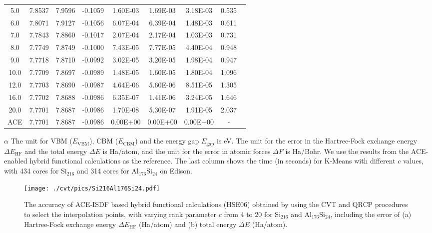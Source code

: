 \begin{table}[htbp]
\begin{threeparttable}
\begin{tabular}{cccccccc}
			 5.0 & 7.8537 & 7.9596 & -0.1059 &  1.60E-03 &  1.69E-03 &  3.18E-03 &  0.535 \ \\
			 6.0 & 7.8071 & 7.9127 & -0.1056 &  6.07E-04 &  6.39E-04 &  1.48E-03 &  0.611 \ \\
			 7.0 & 7.7843 & 7.8860 & -0.1017 &  2.07E-04 &  2.17E-04 &  1.03E-03 &  0.731 \ \\
			 8.0 & 7.7749 & 7.8749 & -0.1000 &  7.43E-05 &  7.77E-05 &  4.40E-04 &  0.948 \ \\
			 9.0 & 7.7718 & 7.8710 & -0.0992 &  3.02E-05 &  3.20E-05 &  1.98E-04 &  0.947 \ \\
			10.0 & 7.7709 & 7.8697 & -0.0989 &  1.48E-05 &  1.60E-05 &  1.80E-04 &  1.096 \ \\
			12.0 & 7.7703 & 7.8690 & -0.0987 &  4.64E-06 &  5.60E-06 &  8.51E-05 &  1.305 \ \\
			16.0 & 7.7702 & 7.8688 & -0.0986 &  6.35E-07 &  1.41E-06 &  3.24E-05 &  1.646 \ \\
			20.0 & 7.7701 & 7.8687 & -0.0986 &  1.70E-08 &  5.30E-07 &  1.91E-05 &  2.037 \ \\
			 ACE & 7.7701 & 7.8687 & -0.0986 &  0.00E+00 &  0.00E+00 &  0.00E+00 &  - \ \\
		\end{tabular}
		\begin{tablenotes}
			\item[$\alpha$] The unit for VBM ($E_\text{VBM}$), CBM ($E_\text{CBM}$)
			and the energy gap $E_\text{gap}$ is eV. The unit for the error in the
			Hartree-Fock exchange energy ${\Delta}E_\text{HF}$ and the total energy
			${\Delta}E$ is Ha/atom, and the unit for the error in atomic forces 
			${\Delta}F$ is Ha/Bohr. We use the results from the ACE-enabled hybrid
			functional calculations as the reference. The last column shows the time 
			(in seconds) for K-Means with different $c$ values, with 434 cores for
			Si$_{216}$ and 314 cores for Al$_{176}$Si$_{24}$ on Edison.
		\end{tablenotes}
	\end{threeparttable}
\end{table}

\begin{figure}[htbp]
	\begin{center}
		\texttt{[image: ./cvt/pics/Si216Al176Si24.pdf]}
	\end{center}
	\caption{The accuracy of ACE-ISDF based hybrid functional calculations (HSE06)
	obtained by using the CVT and QRCP procedures to select the interpolation
	points, with varying rank parameter $c$ from 4 to 20 for Si$_{216}$ and Al$_
	{176}$Si$_{24}$, including the error of (a) Hartree-Fock exchange energy $
	{\Delta}E_\text{HF}$ (Ha/atom) and (b) total energy ${\Delta}E$ (Ha/atom).} 
	\label{fig:Si216Al176Si24}
\end{figure}

